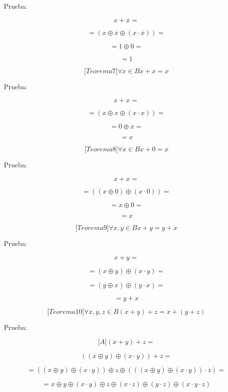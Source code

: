 \documentclass[
]{article}
\begin{document}
\begin{enumerate}
\begin{enumerate}
\begin{enumerate}
      Prueba:

      \[{x + \overline{x}} =\]

      \[{= \left( {x \oplus \overline{x} \oplus \left( {x \cdot \overline{x}} \right)} \right)} =\]

      \[{= {1 \oplus 0}} =\]

      \[= 1\]

      \[{\lbrack{{Teorema}7}\rbrack}\forall{x \in B}{{x + x} = x}\]

      Prueba:

      \[{x + x} =\]

      \[{= \left( {x \oplus x \oplus \left( {x \cdot x} \right)} \right)} =\]

      \[{= {0 \oplus x}} =\]

      \[= x\]

      \[{\lbrack{{Teorema}8}\rbrack}\forall{x \in B}{{x + 0} = x}\]

      Prueba:

      \[{x + x} =\]

      \[{= \left( {\left( {x \oplus 0} \right) \oplus \left( {x \cdot 0} \right)} \right)} =\]

      \[{= {x \oplus 0}} =\]

      \[= x\]

      \[{\lbrack{{Teorema}9}\rbrack}\forall x,{y \in B}{{x + y} = {y + x}}\]

      Prueba:

      \[{x + y} =\]

      \[{= \left( {x \oplus y} \right)} \oplus {\left( {x \cdot y} \right) =}\]

      \[{= \left( {y \oplus x} \right)} \oplus {\left( {y \cdot x} \right) =}\]

      \[= {y + x}\]

      \[{\lbrack{{Teorema}10}\rbrack}\forall x,y,{z \in B}{{\left( {x + y} \right) + z} = {x + \left( {y + z} \right)}}\]

      Prueba:

      \[{\lbrack A\rbrack}{{{({x + y})} + z} =}\]

      \[{{({{({x \oplus y})} \oplus {({x \cdot y})}})} + z} =\]

      \[{= {({{({x \oplus y})} \oplus {({x \cdot y})}})}} \oplus z \oplus {{({{({{({x \oplus y})} \oplus {({x \cdot y})}})} \cdot z})} =}\]

      \[{= x} \oplus y \oplus {({x \cdot y})} \oplus z \oplus {({x \cdot z})} \oplus {({y \cdot z})} \oplus {({{x \cdot y} \cdot z})}\]


\end{enumerate}
\end{enumerate}
\end{enumerate}
\end{document}
